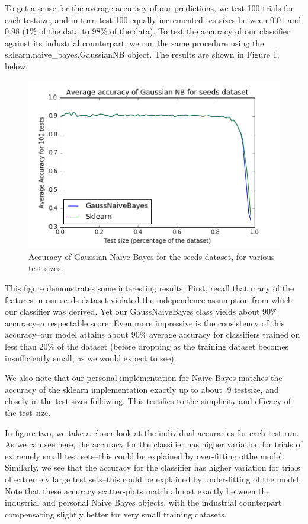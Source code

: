 \documentclass[12pt]{article}
\begin{document}
To get a sense for the average accuracy of our predictions, we test 100 trials for each testsize, and in turn test 100 equally incremented testsizes between $0.01$ and $0.98$ ($1\%$ of the data to $98\%$ of the data).
To test the accuracy of our classifier against its industrial counterpart, we run the same procedure using the sklearn.naive\_bayes.GaussianNB object.
The results are shown in Figure 1, below.
\begin{figure}[H] 
    \centering
    \begin{minipage}[b]{0.6\textwidth}
    \includegraphics[width=\textwidth]{AvAccSeeds.png}
    \end{minipage}
    \caption{Accuracy of Gaussian Naive Bayes for the seeds dataset, for various test sizes. }
\end{figure}
This figure demonstrates some interesting results. 
First, recall that many of the features in our seeds dataset violated the independence assumption from which our classifier was derived.
Yet our GaussNaiveBayes class yields about 90$\%$ accuracy--a respectable score.
Even more impressive is the consistency of this accuracy--our model attains about $90\%$ average accuracy for classifiers trained on less than 20\% of the dataset (before dropping as the training dataset becomes insufficiently small, as we would expect to see).

We also note that our personal implementation for Naive Bayes matches the accuracy of the sklearn implementation exactly up to about .9 testsize, and closely in the test sizes following.
This testifies to the simplicity and efficacy of the test size.

In figure two, we take a closer look at the individual accuracies for each test run. 
As we can see here, the accuracy for the classifier has higher variation for trials of extremely small test sets--this could be explained by over-fitting ofthe model. 
Similarly, we see that the accuracy for the classifier has higher variation for trials of extremely large test sets--this could be explained by under-fitting of the model. 
Note that these accuracy scatter-plots match almost exactly between the industrial and personal Naive Bayes objects, with the industrial counterpart compensating slightly better for very small training datasets.
\end{document}

